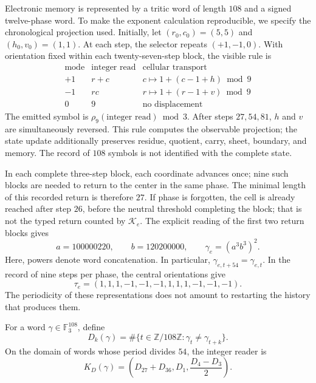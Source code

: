 Electronic memory is represented by a tritic word of length
\(108\) and a signed twelve-phase word. To make the exponent
calculation reproducible, we specify the chronological projection
used. Initially, let
\((r_0,c_0)=(5,5)\) and \((h_0,v_0)=(1,1)\). At each step, the selector
repeats \((+1,-1,0)\). With orientation fixed within each
twenty-seven-step block, the visible rule is
\[
 \begin{array}{c|c|c}
 \text{mode}&\text{integer read}&\text{cellular transport}\\\hline
 +1&r+c&c\mapsto1+(c-1+h)\bmod9\\
 -1&rc&r\mapsto1+(r-1+v)\bmod9\\
 0&9&\text{no displacement}
 \end{array}
\]
The emitted symbol is \(\rho_9(\text{integer read})\bmod3\).
After steps \(27,54,81\), \(h\) and \(v\) are simultaneously
reversed. This rule computes the observable projection; the
state update additionally preserves residue, quotient,
carry, sheet, boundary, and memory. The record of
\(108\) symbols is not identified with the complete state.

In each complete three-step block, each coordinate advances
once; nine such blocks are needed to return to the center in
the same phase. The minimal length of this recorded return is
therefore \(27\). If phase is forgotten, the cell is already reached after
step \(26\), before the neutral threshold completing the block; that is not
the typed return counted by \(\mathcal K_e\). The explicit reading
of the first two return blocks gives
\begin{equation}
 a=100000220,\qquad b=120200000,\qquad
 \gamma_e=(a^3b^3)^2.
 \label{eq:el-palabra}
\end{equation}
Here, powers denote word concatenation. In particular,
\(\gamma_{e,t+54}=\gamma_{e,t}\). In the record of nine steps per
phase, the central orientations give
\begin{equation}
 \tau_e=(1,1,1,-1,-1,-1,1,1,1,-1,-1,-1).
 \label{eq:el-tau}
\end{equation}
The periodicity of these representations does not amount to restarting the
history that produces them.



\begin{definition}
For a word \(\gamma\in\mathbb F_3^{108}\), define
\[
 D_k(\gamma)=\#\{t\in\mathbb Z/108\mathbb Z:
                   \gamma_t\ne\gamma_{t+k}\}.
\]
On the domain of words whose period divides \(54\), the integer
reader is
\begin{equation}
 K_D(\gamma)=\left(D_{27}+D_{36},D_1,\frac{D_4-D_3}{2}\right).
 \label{eq:el-kd}
\end{equation}
\end{definition}

